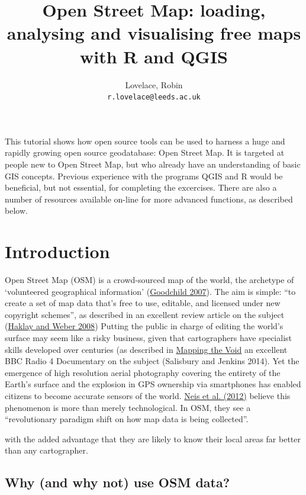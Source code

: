 \documentclass[]{article}
\author{
Lovelace, Robin\\
\texttt{r.lovelace@leeds.ac.uk}
}
\title{Open Street Map: loading, analysing and visualising free maps with R and QGIS}
\begin{document}
\maketitle




This tutorial shows how open source tools can be used to harness a huge
and rapidly growing open source geodatabase: Open Street Map. It is
targeted at people new to Open Street Map, but who already have an
understanding of basic GIS concepts. Previous experience with the
programs QGIS and R would be beneficial, but not essential, for
completing the excercises. There are also a number of resources
available on-line for more advanced functions, as described below.

\section{Introduction}

Open Street Map (OSM) is a crowd-sourced map of the world, the archetype
of `volunteered geographical information'
(\href{http://www.ncgia.ucsb.edu/projects/vgi/docs/position/Goodchild\_VGI2007.pdf}{Goodchild
2007}). The aim is simple: ``to create a set of map data that's free to
use, editable, and licensed under new copyright schemes'', as described
in an excellent review article on the subject
(\href{http://discovery.ucl.ac.uk/13849/1/13849.pdf}{Haklay and Weber
2008}) Putting the public in charge of editing the world's surface may
seem like a risky business, given that cartographers have specialist
skills developed over centuries (as described in
\href{https://dl.dropboxusercontent.com/u/15008199/egs2stay/Mapping\_the\_Void\_-\_Mapping\_the\_Void\_b03s6mf0\_default.m4a}{Mapping
the Void} an excellent BBC Radio 4 Documentary on the subject (Salisbury
and Jenkins 2014). Yet the emergence of high resolution aerial
photography covering the entirety of the Earth's surface and the
explosion in GPS ownership via smartphones has enabled citizens to
become accurate sensors of the world.
\href{http://www.mdpi.com/1999-5903/4/1/1/pdf}{Neis et al. (2012)}
believe this phenomenon is more than merely technological. In OSM, they
see a ``revolutionary paradigm shift on how map data is being
collected''.

with the added advantage that they are likely to know their local areas
far better than any cartographer.

\subsection{Why (and why not) use OSM data?}
\end{document}
